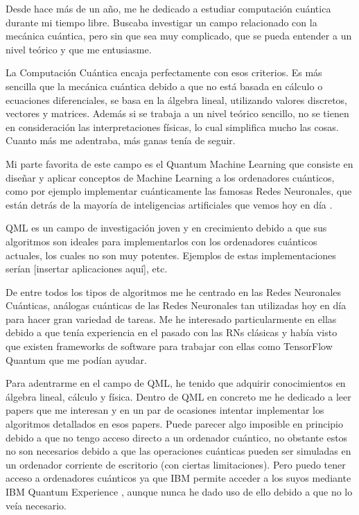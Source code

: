 Desde hace más de un año, me he dedicado a estudiar computación cuántica durante mi tiempo libre. Buscaba investigar un campo relacionado con la mecánica cuántica, pero sin que sea muy complicado, que se pueda entender a un nivel teórico y que me entusiasme.

La Computación Cuántica encaja perfectamente con esos criterios. Es más sencilla que la mecánica cuántica debido a que no está basada en cálculo o ecuaciones diferenciales, se basa en la álgebra lineal, utilizando valores discretos, vectores y matrices. Además si se trabaja a un nivel teórico sencillo, no se tienen en consideración las interpretaciones físicas, lo cual simplifica mucho las cosas. Cuanto más me adentraba, más ganas tenía de seguir. 

Mi parte favorita de este campo es el Quantum Machine Learning que consiste en diseñar y aplicar conceptos de Machine Learning  a los ordenadores cuánticos, como por ejemplo implementar cuánticamente las famosas Redes Neuronales, que están detrás de la mayoría de inteligencias artificiales que vemos hoy en día \cite{schuld:2014}.

QML es un campo de investigación joven y en crecimiento debido a que sus algoritmos son ideales para implementarlos con los ordenadores cuánticos actuales, los cuales no son muy potentes. Ejemplos de estas implementaciones serían [insertar aplicaciones aquí], etc.

De entre todos los tipos de algoritmos me he centrado en las Redes Neuronales Cuánticas, análogas cuánticas de las Redes Neuronales tan utilizadas hoy en día para hacer gran variedad de tareas. Me he interesado particularmente en ellas debido a que tenía experiencia en el pasado con las RNs clásicas y había visto que existen frameworks de software para trabajar con ellas como TensorFlow Quantum \cite{tfq} que me podían ayudar. 

Para adentrarme en el campo de QML, he tenido que adquirir conocimientos en álgebra lineal, cálculo y física. Dentro de QML en concreto me he dedicado a leer papers que me interesan y en un par de ocasiones intentar implementar los algoritmos detallados en esos papers. Puede parecer algo imposible en principio debido a que no tengo acceso directo a un ordenador cuántico,  no obstante estos no son necesarios debido a que las operaciones cuánticas pueden ser simuladas en un ordenador corriente de escritorio (con ciertas limitaciones). Pero puedo tener acceso a ordenadores cuánticos ya que IBM permite acceder a los suyos mediante IBM Quantum Experience \cite{IBM_Q}, aunque nunca he dado uso de ello debido a que no lo veía necesario.

